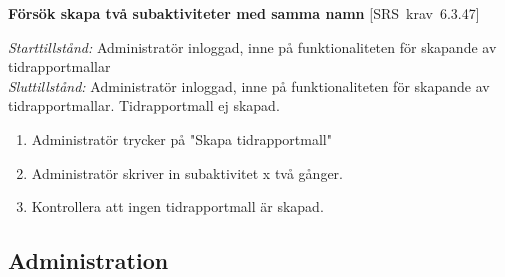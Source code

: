 \documentclass[a4paper]{article}
\def\reqinside{\hfil\penalty 100 \hfilneg \hbox}
\def \req [#1]{\reqinside{[SRS krav #1]}}
\begin{document}
\begin{FT}
\item
\textbf{Försök skapa två subaktiviteter med samma namn} \req[6.3.47]

\emph{Starttillstånd:} Administratör inloggad, inne på funktionaliteten för skapande av tidrapportmallar\\
\emph{Sluttillstånd:} Administratör inloggad, inne på funktionaliteten för skapande av tidrapportmallar. Tidrapportmall ej skapad.\\

\begin{enumerate}
\item Administratör trycker på "Skapa tidrapportmall"
\item Administratör skriver in subaktivitet x två gånger.
\item Kontrollera att ingen tidrapportmall är skapad.
\end{enumerate}

\end{FT}






\subsection{Administration}
\end{document}
